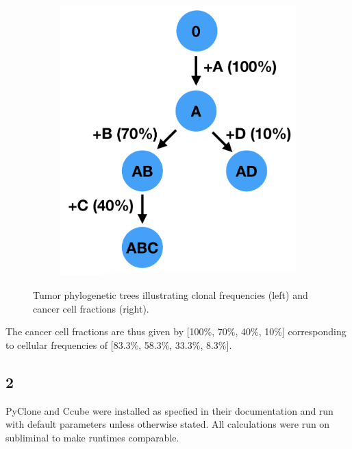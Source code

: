 \documentclass{article}
\begin{document}
\begin{figure}[h]
	\begin{subfigure}[t]{0.29\linewidth}
		\centering
		\includegraphics[width = 1.0\linewidth, trim={0 0 0 0}, clip=true]{tree2.png}
		\label{fig:tree2}	
	\end{subfigure}%
\caption{Tumor phylogenetic trees illustrating clonal frequencies (left) and cancer cell fractions (right).}
\label{fig:tree}
\end{figure}

The cancer cell fractions are thus given by [100\%, 70\%, 40\%, 10\%] corresponding to cellular frequencies of [83.3\%, 58.3\%, 33.3\%, 8.3\%].

\subsection*{2}

PyClone and Ccube were installed as specfied in their documentation and run with default parameters unless otherwise stated. All calculations were run on subliminal to make runtimes comparable.
\end{document}
